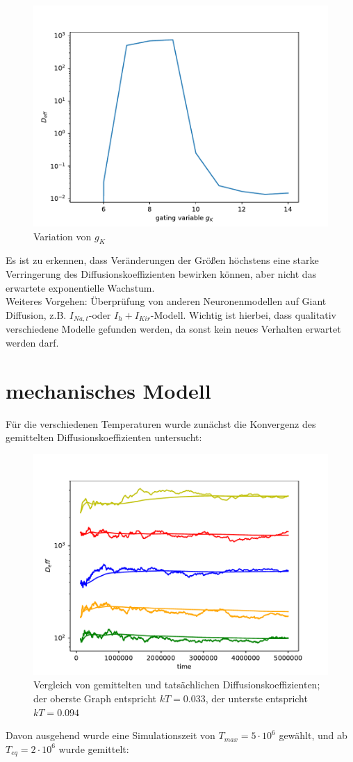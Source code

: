 \documentclass[12pt,a4paper]{article}
\begin{document}
\begin{figure}[H]
	\centering
	\includegraphics[scale=0.9]{dneurgkvar.pdf} 
	\caption{Variation von $g_K$}
	\label{gkvar}
\end{figure} 
Es ist zu erkennen, dass Veränderungen der Größen höchstens eine starke Verringerung des Diffusionskoeffizienten bewirken können, aber nicht das erwartete exponentielle Wachstum.\\
Weiteres Vorgehen: Überprüfung von anderen Neuronenmodellen  auf Giant Diffusion, z.B. $I_{Na,t}$-oder $I_h+I_{Kir}$-Modell. Wichtig ist hierbei, dass qualitativ verschiedene Modelle gefunden werden, da sonst kein neues Verhalten erwartet werden darf.
\section{mechanisches Modell}
Für die verschiedenen Temperaturen wurde zunächst die Konvergenz des gemittelten Diffusionskoeffizienten untersucht:
\begin{figure}[H]
	\centering
	\includegraphics[scale=0.9]{dmechav.pdf} 
	\caption{Vergleich von gemittelten und tatsächlichen Diffusionskoeffizienten; der oberste Graph entspricht $kT=0.033$, der unterste entspricht $kT=0.094$}
	\label{dav}
\end{figure} 
Davon ausgehend wurde eine Simulationszeit von $T_{max}=5\cdot 10^6$ gewählt, und ab $T_{eq}=2\cdot 10^6$ wurde gemittelt:
 
\end{document}
